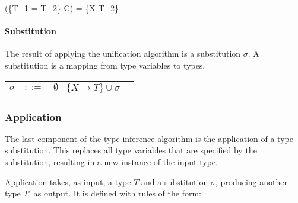 \documentclass[class=article, crop=false]{standalone}
\begin{document}
  {\gamma \vdash {}(\{T_1 = T_2\} \cup C) = \{X \rightarrow T_2\} \cup \sigma}

\paragraph{Substitution}

The result of applying the unification algorithm is a substitution $\sigma$.
A substitution is a mapping from type variables to types.

\medskip

{\setlength\tabcolsep{8pt}
\begin{tabular}{>{$}l<{$}>{$}r<{$}>{$}l<{$}>{$}r<{$}}
\sigma &::=  & \emptyset \; | \; \{X \rightarrow T\} \cup \sigma\\
\end{tabular}}

\subsubsection{Application}\label{Application}

The last component of the type inference algorithm is the application of a type substitution.
This replaces all type variables that are specified by the substitution, resulting in a new instance of the input type.

Application takes, as input, a type $T$ and a substitution $\sigma$, producing another type $T'$ as output.
It is defined with rules of the form:

\end{document}
